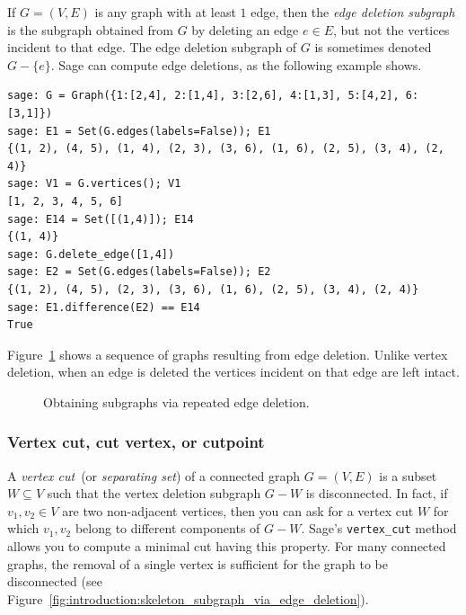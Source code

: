 If $G = (V,E)$ is any graph with at least $1$ edge, then the
\emph{edge deletion subgraph} is the subgraph obtained from $G$ by
deleting an edge $e \in E$, but not the vertices incident to that edge.
The edge deletion subgraph of $G$ is sometimes denoted $G - \{e\}$.
Sage can compute edge deletions, as the following example shows.
\begin{lstlisting}
sage: G = Graph({1:[2,4], 2:[1,4], 3:[2,6], 4:[1,3], 5:[4,2], 6:[3,1]})
sage: E1 = Set(G.edges(labels=False)); E1
{(1, 2), (4, 5), (1, 4), (2, 3), (3, 6), (1, 6), (2, 5), (3, 4), (2, 4)}
sage: V1 = G.vertices(); V1
[1, 2, 3, 4, 5, 6]
sage: E14 = Set([(1,4)]); E14
{(1, 4)}
sage: G.delete_edge([1,4])
sage: E2 = Set(G.edges(labels=False)); E2
{(1, 2), (4, 5), (2, 3), (3, 6), (1, 6), (2, 5), (3, 4), (2, 4)}
sage: E1.difference(E2) == E14
True
\end{lstlisting}
Figure~\ref{fig:introduction:edge_deletion_subgraphs} shows a sequence
of graphs resulting from edge deletion. Unlike vertex deletion, when
an edge is deleted the vertices incident on that edge are left
intact.

\begin{figure}[!htbp]
\centering
{}

\caption{Obtaining subgraphs via repeated edge deletion.}
\label{fig:introduction:edge_deletion_subgraphs}
\end{figure}



\subsubsection{Vertex cut, cut vertex, or cutpoint}

A \emph{vertex cut}~(or
\emph{separating set}) of a connected graph
$G = (V, E)$ is a subset $W \subseteq V$ such that the vertex deletion
subgraph $G - W$ is disconnected. In fact, if $v_1, v_2 \in V$ are two
non-adjacent vertices, then you can ask for a vertex cut $W$ for which
$v_1, v_2$ belong to different components of $G - W$. Sage's
\verb!vertex_cut! method allows you to compute a minimal cut having
this property. For many connected graphs, the removal of a single
vertex is sufficient for the graph to be disconnected
(see Figure~\ref{fig:introduction:skeleton_subgraph_via_edge_deletion}).


